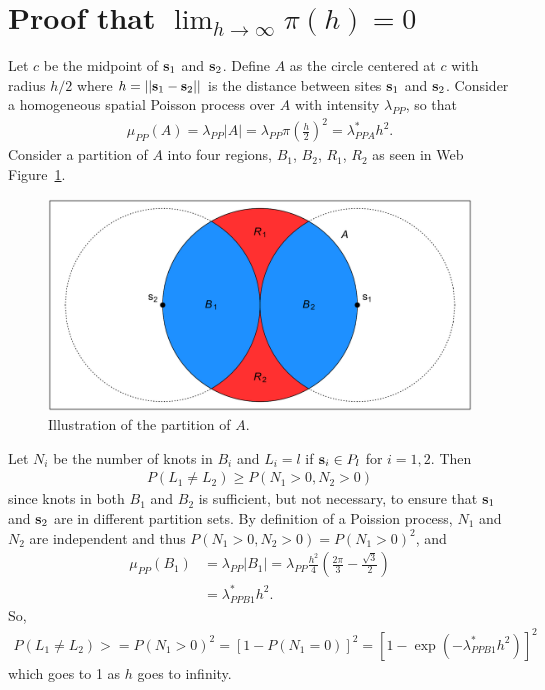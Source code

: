 \documentclass[useAMS,usenatbib,referee]{biomweb}
\renewcommand{\fref}[1]{Web Figure~\ref{#1}}
\begin{document}
\section{Proof that $\lim_{h \rightarrow \infty} \pi(h) = 0$} \label{sta:proofsamepartition}
Let $c$ be the midpoint of $\mbox{\bf s}_1$ and $\mbox{\bf s}_2$.
Define $A$ as the circle centered at $c$ with radius $h / 2$ where $h = ||\mbox{\bf s}_1 - \mbox{\bf s}_2||$ is the distance between sites $\mbox{\bf s}_1$ and $\mbox{\bf s}_2$.
Consider a homogeneous spatial Poisson process over $A$ with intensity $\lambda_{PP}$, so that
\begin{align*}
  \mu_{PP}(A) = \lambda_{PP} |A| = \lambda_{PP} \pi \left(\frac{h}{2}\right)^2 = \lambda_{PPA}^* h^2.
\end{align*}
Consider a partition of $A$ into four regions, $B_1$, $B_2$, $R_1$, $R_2$ as seen in \fref{stfig:hpp}.
\begin{figure}
  \includegraphics[width=\linewidth]{plots/circles}
  \caption{Illustration of the partition of $A$.}
  \label{stfig:hpp}
\end{figure}
Let $N_i$ be the number of knots in $B_i$ and $L_i = l$ if $\mbox{\bf s}_i \in P_l$ for $i = 1, 2$.
Then
\begin{align}
  P(L_1 \neq L_2) \ge P(N_1 > 0, N_2 > 0)
\end{align}
since knots in both $B_1$ and $B_2$ is sufficient, but not necessary, to ensure that $\mbox{\bf s}_1$ and $\mbox{\bf s}_2$ are in different partition sets.
By definition of a Poission process, $N_1$ and $N_2$ are independent and thus $P(N_1 > 0, N_2 > 0) = P(N_1 > 0)^2$, and
\begin{align}
  \mu_{PP}(B_1) &= \lambda_{PP} |B_1| = \lambda_{PP} \frac{h^2}{4} \left(\frac{2 \pi}{3} - \frac{\sqrt{3}}{2} \right) \nonumber \\
       &= \lambda^*_{PPB1} h^2.
\end{align}
So,
\begin{align}
  P(L_1 \neq L_2) >= P(N_1 > 0)^2 = [1 - P(N_1 = 0)]^2 = [1 - \exp\left(-\lambda^*_{PPB1} h^2\right)]^2
\end{align}
which goes to 1 as $h$ goes to infinity.
\end{document}
